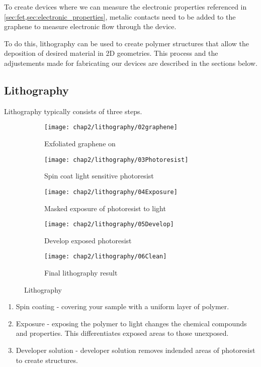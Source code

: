 \documentclass[../../Matt_Gebert_Honours_Thesis.tex]{subfiles}
\begin{document}
	
	To create devices where we can measure the electronic properties referenced in \cref{sec:fet,sec:electronic_properties}, metalic contacts need to be added to the graphene to measure electronic flow through the device. 
	
	To do this, lithography can be used to create polymer structures that allow the deposition of desired material in 2D geometries. This process and the adjustements made for fabricating our devices are described in the sections below.
	
	\subsection{Lithography}\label{sec:lithography}
	Lithography typically consists of three steps.
	
	\begin{figure}[H]
		\centering
		\begin{subfigure}{0.3\textwidth}
			\centering
			\texttt{[image: chap2/lithography/02graphene]}
			\caption{Exfoliated graphene on \silicondioxide}
		\end{subfigure}
		\hspace{0.04\textwidth}
		\begin{subfigure}{0.28\textwidth}
			\texttt{[image: chap2/lithography/03Photoresist]}
			\centering
			\caption{Spin coat light sensitive photoresist}
		\end{subfigure}
		\hspace{0.04\textwidth}
		\begin{subfigure}{0.28\textwidth}
			\centering
			\texttt{[image: chap2/lithography/04Exposure]}
			\caption{Masked exposure of photoresist to light}
		\end{subfigure}
		\begin{subfigure}{0.28\textwidth}
			\centering
			\texttt{[image: chap2/lithography/05Develop]}
			\caption{Develop exposed photoresist}
		\end{subfigure}
		\begin{subfigure}{0.28\textwidth}
			\centering
			\texttt{[image: chap2/lithography/06Clean]}
			\caption{Final lithography result}
		\end{subfigure}
		\caption{Lithography}\label{fig:litho}
	\end{figure}
	
	\begin{enumerate}
		\item Spin coating - covering your sample with a uniform layer of polymer.
		\item Exposure - exposing the polymer to light changes the chemical compounds and properties. This differentiates exposed areas to those unexposed.
		\item Developer solution - developer solution removes indended areas of photoresist to create structures.
	\end{enumerate}
	
\end{document}
